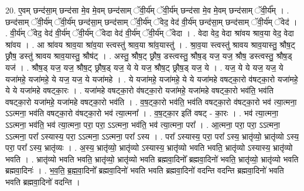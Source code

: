 \documentclass[17pt]{extarticle}
\begin{document}
20. ए॒वम् छन्द॑सा॒म् छन्द॑सा मे॒व मे॒वम् छन्द॑साम् ॅवी॒र्य॑म् ॅवी॒र्य॑म् छन्द॑सा मे॒व मे॒वम् छन्द॑साम् ॅवी॒र्य᳚म् । . छन्द॑साम् ॅवी॒र्य॑म् ॅवी॒र्य॑म् छन्द॑सा॒म् छन्द॑साम् ॅवी॒र्य॑म् ॅवेद॒ वेद॑ वी॒र्य॑म् छन्द॑सा॒म् छन्द॑साम् ॅवी॒र्य॑म् ॅवेद॑ । . वी॒र्य॑म् ॅवेद॒ वेद॑ वी॒र्य॑म् ॅवी॒र्य॑म् ॅवेदा वेद॑ वी॒र्य॑म् ॅवी॒र्य॑म् ॅवेदा । . वेदा वेद॒ वेदा श्रा॑वय श्राव॒या वेद॒ वेदा श्रा॑वय । . आ श्रा॑वय श्राव॒या श्रा॑व॒या स्त्वस्तु॑ श्राव॒या श्रा॑व॒यास्तु॑ । . श्रा॒व॒या स्त्वस्तु॑ श्रावय श्राव॒यास्तु॒ श्रौष॒ट् छ्रौष॒ डस्तु॑ श्रावय श्राव॒यास्तु॒ श्रौष॑ट् । . अस्तु॒ श्रौष॒ट् छ्रौष॒ डस्त्वस्तु॒ श्रौष॒ड् यज॒ यज॒ श्रौष॒ डस्त्वस्तु॒ श्रौष॒ड् यज॑ । . श्रौष॒ड् यज॒ यज॒ श्रौष॒ट् छ्रौष॒ड् यज॒ ये ये यज॒ श्रौष॒ट् छ्रौष॒ड् यज॒ ये । . यज॒ ये ये यज॒ यज॒ ये यजा॑महे॒ यजा॑महे॒ ये यज॒ यज॒ ये यजा॑महे । . ये यजा॑महे॒ यजा॑महे॒ ये ये यजा॑महे वषट्का॒रो व॑षट्का॒रो यजा॑महे॒ ये ये यजा॑महे वषट्का॒रः । . यजा॑महे वषट्का॒रो व॑षट्का॒रो यजा॑महे॒ यजा॑महे वषट्का॒रो भव॑ति॒ भव॑ति वषट्का॒रो यजा॑महे॒ यजा॑महे वषट्का॒रो भव॑ति । . व॒ष॒ट्का॒रो भव॑ति॒ भव॑ति वषट्का॒रो व॑षट्का॒रो भव॑ त्या॒त्मना॒ ऽऽत्मना॒ भव॑ति वषट्का॒रो व॑षट्का॒रो भव॑ त्या॒त्मना᳚ । . व॒ष॒ट्का॒र इति॑ वषट् - का॒रः । . भव॑ त्या॒त्मना॒ ऽऽत्मना॒ भव॑ति॒ भव॑ त्या॒त्मना॒ परा॒ परा॒ ऽऽत्मना॒ भव॑ति॒ भव॑ त्या॒त्मना॒ परा᳚ । . आ॒त्मना॒ परा॒ परा॒ ऽऽत्मना॒ ऽऽत्मना॒ परा᳚ ऽस्यास्य॒ परा॒ ऽऽत्मना॒ ऽऽत्मना॒ परा᳚ ऽस्य । . परा᳚ ऽस्यास्य॒ परा॒ परा᳚ ऽस्य॒ भ्रातृ॑व्यो॒ भ्रातृ॑व्यो ऽस्य॒ परा॒ परा᳚ ऽस्य॒ भ्रातृ॑व्यः । . अ॒स्य॒ भ्रातृ॑व्यो॒ भ्रातृ॑व्यो ऽस्यास्य॒ भ्रातृ॑व्यो भवति भवति॒ भ्रातृ॑व्यो ऽस्यास्य॒ भ्रातृ॑व्यो भवति । . भ्रातृ॑व्यो भवति भवति॒ भ्रातृ॑व्यो॒ भ्रातृ॑व्यो भवति ब्रह्मवा॒दिनो᳚ ब्रह्मवा॒दिनो॑ भवति॒ भ्रातृ॑व्यो॒ भ्रातृ॑व्यो भवति ब्रह्मवा॒दिनः॑ । . भ॒व॒ति॒ ब्र॒ह्म॒वा॒दिनो᳚ ब्रह्मवा॒दिनो॑ भवति भवति ब्रह्मवा॒दिनो॑ वदन्ति वदन्ति ब्रह्मवा॒दिनो॑ भवति भवति ब्रह्मवा॒दिनो॑ वदन्ति । \newline
\end{document}
